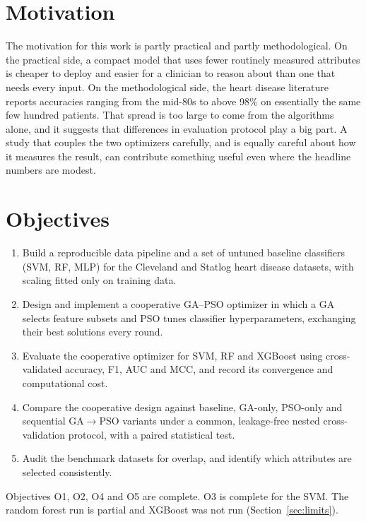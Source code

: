 \documentclass[MTech]{ugthesis}
\begin{document}
\section{Motivation}
The motivation for this work is partly practical and partly methodological. On the practical side, a compact model that uses fewer routinely measured attributes is cheaper to deploy and easier for a clinician to reason about than one that needs every input. On the methodological side, the heart disease literature reports accuracies ranging from the mid-80s to above 98\% on essentially the same few hundred patients. That spread is too large to come from the algorithms alone, and it suggests that differences in evaluation protocol play a big part. A study that couples the two optimizers carefully, and is equally careful about how it measures the result, can contribute something useful even where the headline numbers are modest.

\section{Objectives}
\label{sec:objectives}
\begin{enumerate}
\item[O1] Build a reproducible data pipeline and a set of untuned baseline classifiers (SVM, RF, MLP) for the Cleveland and Statlog heart disease datasets, with scaling fitted only on training data.
\item[O2] Design and implement a cooperative GA--PSO optimizer in which a GA selects feature subsets and PSO tunes classifier hyperparameters, exchanging their best solutions every round.
\item[O3] Evaluate the cooperative optimizer for SVM, RF and XGBoost using cross-validated accuracy, F1, \ac{AUC} and \ac{MCC}, and record its convergence and computational cost.
\item[O4] Compare the cooperative design against baseline, GA-only, PSO-only and sequential GA$\rightarrow$PSO variants under a common, leakage-free nested cross-validation protocol, with a paired statistical test.
\item[O5] Audit the benchmark datasets for overlap, and identify which attributes are selected consistently.
\end{enumerate}
Objectives O1, O2, O4 and O5 are complete. O3 is complete for the SVM. The random forest run is partial and XGBoost was not run (Section~\ref{sec:limits}).
\end{document}
